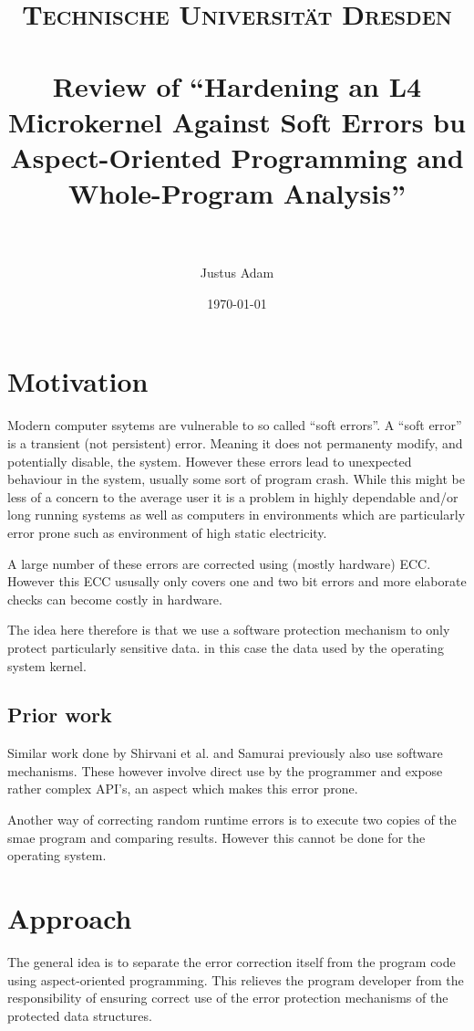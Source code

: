 \documentclass[paper=a4, fontsize=11pt]{scrartcl} %
\title{	
\normalfont \normalsize 
\textsc{Technische Universität Dresden} \\ [25pt] %
\horrule{0.5pt} \\[0.4cm] %
\huge Review of ``Hardening an L4 Microkernel Against Soft Errors bu Aspect-Oriented Programming and Whole-Program Analysis'' \\ %
\horrule{2pt} \\[0.5cm] %
}
\author{Justus Adam} %
\date{\normalsize\today} %
\numberwithin{equation}{section} %
\numberwithin{figure}{section} %
\numberwithin{table}{section} %
\begin{document}
\maketitle %

\section{Motivation}

Modern computer ssytems are vulnerable to so called ``soft errors''.
A ``soft error'' is a transient (not persistent) error.
Meaning it does not permanenty modify, and potentially disable, the system.
However these errors lead to unexpected behaviour in the system, usually some sort of program crash.
While this might be less of a concern to the average user it is a problem in highly dependable and/or long running systems as well as computers in environments which are particularly error prone such as environment of high static electricity.

A large number of these errors are corrected using (mostly hardware) ECC.
However this ECC ususally only covers one and two bit errors and more elaborate checks can become costly in hardware.

The idea here therefore is that we use a software protection mechanism to only protect particularly sensitive data.
in this case the data used by the operating system kernel.

\subsection{Prior work}

Similar work done by Shirvani et al. and Samurai previously also use software mechanisms.
These however involve direct use by the programmer and expose rather complex API's, an aspect which makes this error prone.

Another way of correcting random runtime errors is to execute two copies of the smae program and comparing results.
However this cannot be done for the operating system.

\section{Approach}

The general idea is to separate the error correction itself from the program code using aspect-oriented programming.
This relieves the program developer from the responsibility of ensuring correct use of the error protection mechanisms of the protected data structures.
\end{document}
